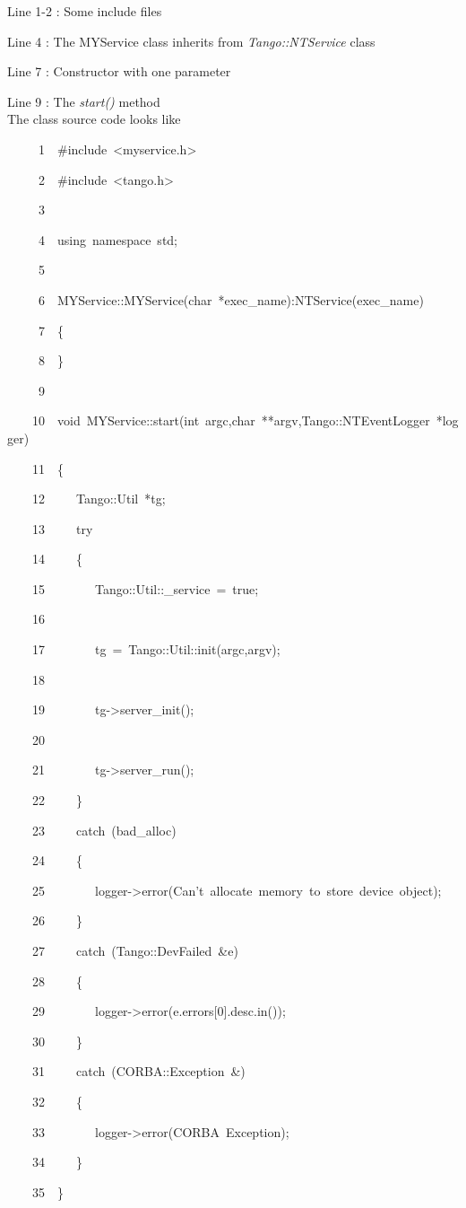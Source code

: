 Line 1-2 : Some include files

Line 4 : The MYService class inherits from \emph{Tango::NTService}
class

Line 7 : Constructor with one parameter

Line 9 : The \emph{start()} method\\

The class source code looks like


\begin{lyxcode}
~~~~~1~~\#include~<myservice.h>

~~~~~2~~\#include~<tango.h>

~~~~~3~~

~~~~~4~~using~namespace~std;

~~~~~5~~

~~~~~6~~MYService::MYService(char~{*}exec\_name):NTService(exec\_name)

~~~~~7~~\{

~~~~~8~~\}

~~~~~9~~

~~~~10~~void~MYService::start(int~argc,char~{*}{*}argv,Tango::NTEventLogger~{*}logger)

~~~~11~~\{

~~~~12~~~~~Tango::Util~{*}tg;

~~~~13~~~~~try

~~~~14~~~~~\{

~~~~15~~~~~~~~Tango::Util::\_service~=~true;

~~~~16~~

~~~~17~~~~~~~~tg~=~Tango::Util::init(argc,argv);

~~~~18~~

~~~~19~~~~~~~~tg->server\_init();

~~~~20~~

~~~~21~~~~~~~~tg->server\_run();

~~~~22~~~~~\}

~~~~23~~~~~catch~(bad\_alloc)

~~~~24~~~~~\{

~~~~25~~~~~~~~logger->error(\textquotedbl{}Can't~allocate~memory~to~store~device~object\textquotedbl{});

~~~~26~~~~~\}

~~~~27~~~~~catch~(Tango::DevFailed~\&e)

~~~~28~~~~~\{

~~~~29~~~~~~~~logger->error(e.errors{[}0{]}.desc.in());

~~~~30~~~~~\}

~~~~31~~~~~catch~(CORBA::Exception~\&)

~~~~32~~~~~\{

~~~~33~~~~~~~~logger->error(\textquotedbl{}CORBA~Exception\textquotedbl{});

~~~~34~~~~~\}

~~~~35~~\}
\end{lyxcode}

